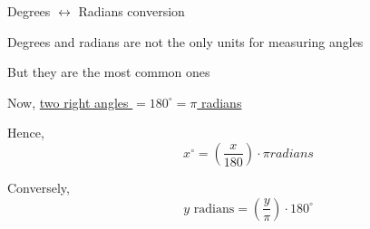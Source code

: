 \documentclass[14pt,fleqn]{extarticle}
\begin{document}
\begin{skill}
\begin{narrow}
Degrees $\longleftrightarrow$ Radians conversion
\end{narrow}

%

\reason

Degrees and radians are not the
only units for measuring angles \newline 

But they are the most common ones \newline 

Now, \underline{two right angles $= 180^\circ = \pi$ radians}\newline 

Hence, 
\[\qquad  x^\circ = \left(\frac{x}{180}\right)\cdot\pi radians \]

Conversely, 
\[ \qquad y \text{ radians} = \left( \frac{y}\pi\right)\cdot 180^\circ\]
%

\end{skill}
\end{document}
